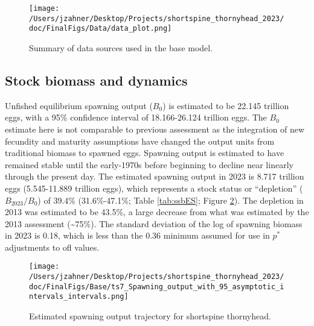 \documentclass[11pt,
  english,
  letterpaper,
]{article}
\begin{document}
\begin{figure}
\centering
\texttt{[image: /Users/jzahner/Desktop/Projects/shortspine\_thornyhead\_2023/doc/FinalFigs/Data/data\_plot.png]}
\caption{Summary of data sources used in the base model.\label{fig:assessment_data_timeseriesES}}
\end{figure}

\hypertarget{stock-biomass-and-dynamics}{%
\subsection*{Stock biomass and dynamics}\label{stock-biomass-and-dynamics}}

Unfished equilibrium spawning output (\(B_0\)) is estimated to be 22.145 trillion eggs, with a 95\% confidence interval of 18.166-26.124 trillion eggs. The \(B_0\) estimate here is not comparable to previous assessment as the integration of new fecundity and maturity assumptions have changed the output units from traditional biomass to spawned eggs. Spawning output is estimated to have remained stable until the early-1970s before beginning to decline near linearly through the present day. The estimated spawning output in 2023 is 8.717 trillion eggs (5.545-11.889 trillion eggs), which represents a stock status or ``depletion'' (\(B_{2023}/B_0\)) of 39.4\% (31.6\%-47.1\%; Table \ref{tab:ssbES}; Figure \ref{fig:ssb_trajectoryES}). The depletion in 2013 was estimated to be 43.5\%, a large decrease from what was estimated by the 2013 assessment (\textasciitilde75\%). The standard deviation of the log of spawning biomass in 2023 is 0.18, which is less than the 0.36 minimum assumed for use in \(p^*\) adjustments to \gls{ofl} values.

\begin{figure}
\centering
\texttt{[image: /Users/jzahner/Desktop/Projects/shortspine\_thornyhead\_2023/doc/FinalFigs/Base/ts7\_Spawning\_output\_with\_95\_asymptotic\_intervals\_intervals.png]}
\caption{Estimated spawning output trajectory for shortspine thornyhead.\label{fig:ssb_trajectoryES}}
\end{figure}

\begingroup\fontsize{10}{12}\selectfont
\begingroup\fontsize{10}{12}\selectfont
\end{document}
